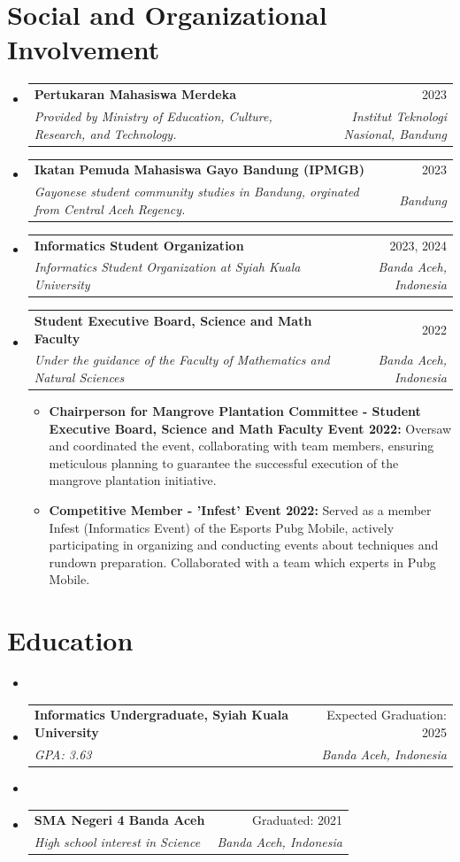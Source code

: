 \documentclass[letterpaper,10pt]{article}
\makeatletter
\newcommand{\resumeSubheading}[4]{
  \vspace{-1pt}
  \item
  \begin{tabular*}{0.97\textwidth}{l@{\extracolsep{\fill}}r}
    \textbf{#1} & #2 \\
    \textit{\small#3} & \textit{\small #4} \\
  \end{tabular*}\vspace{-5pt}
}
\makeatother
\begin{document}
\section{Social and Organizational Involvement}
\begin{itemize}[leftmargin=0.15in, label={}]
    \resumeSubheading{Pertukaran Mahasiswa Merdeka}{2023} {Provided by Ministry of Education, Culture, Research, and Technology.}{Institut Teknologi Nasional, Bandung}
    \resumeSubheading{Ikatan Pemuda Mahasiswa Gayo Bandung (IPMGB)}{2023}{Gayonese student community studies in Bandung, orginated from Central Aceh Regency.}{Bandung}
    \resumeSubheading{Informatics Student Organization}{2023, 2024} {Informatics Student Organization at Syiah Kuala University}{Banda Aceh, Indonesia}
    \resumeSubheading{Student Executive Board, Science and Math Faculty}{2022} {Under the guidance of the Faculty of Mathematics and Natural Sciences}{Banda Aceh, Indonesia}


    \begin{itemize}[leftmargin=0.07in, label={}]
      \item \textbf{Chairperson for Mangrove Plantation Committee - Student Executive Board, Science and Math Faculty Event 2022:} Oversaw and coordinated the event, collaborating with team members, ensuring meticulous planning to guarantee the successful execution of the mangrove plantation initiative.

      \item \textbf{Competitive Member - 'Infest' Event 2022:} Served as a member Infest (Informatics Event) of the Esports Pubg Mobile, actively participating in organizing and conducting events about techniques and rundown preparation. Collaborated with a team which experts in Pubg Mobile.
    \end{itemize}
\end{itemize}

\section{Education}
\vspace{-0.1in}  %
\begin{itemize}[leftmargin=0.15in, label={}]
  \item \resumeSubheading{Informatics Undergraduate, Syiah Kuala University}{Expected Graduation: 2025}{GPA: 3.63}{Banda Aceh, Indonesia}
  \item \resumeSubheading{SMA Negeri 4 Banda Aceh}{Graduated: 2021}{High school interest in Science}{Banda Aceh, Indonesia}
\end{itemize}
\end{document}
